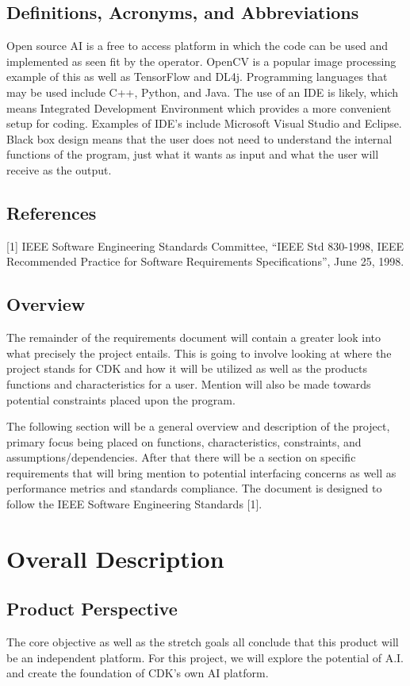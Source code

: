 \documentclass[onecolumn, draftclsnofoot,10pt, compsoc]{IEEEtran}
\begin{document}
\subsection{Definitions, Acronyms, and Abbreviations}
Open source AI is a free to access platform in which the code can be used and implemented as seen fit by the operator. OpenCV is a popular image processing example of this as well as TensorFlow and DL4j. Programming languages that may be used include C++, Python, and Java. The use of an IDE is likely, which means Integrated Development Environment which provides a more convenient setup for coding. Examples of IDE’s include Microsoft Visual Studio and Eclipse. Black box design means that the user does not need to understand the internal functions of the program, just what it wants as input and what the user will receive as the output. 

\subsection{References}
[1] IEEE Software Engineering Standards Committee, “IEEE Std 830-1998, IEEE Recommended Practice for Software Requirements Specifications”, June 25, 1998.

\subsection{Overview}
The remainder of the requirements document will contain a greater look into what precisely the project entails. This is going to involve looking at where the project stands for CDK and how it will be utilized as well as the products functions and characteristics for a user. Mention will also be made towards potential constraints placed upon the program.

The following section will be a general overview and description of the project, primary focus being placed on functions, characteristics, constraints, and assumptions/dependencies. After that there will be a section on specific requirements that will bring mention to potential interfacing concerns as well as performance metrics and standards compliance. The document is designed to follow the IEEE Software Engineering Standards [1].


\section{Overall Description}
\subsection{Product Perspective}
The core objective as well as the stretch goals all conclude that this product will be an independent platform. For this project, we will explore the potential of A.I. and create the foundation of CDK’s own AI platform.
\end{document}
